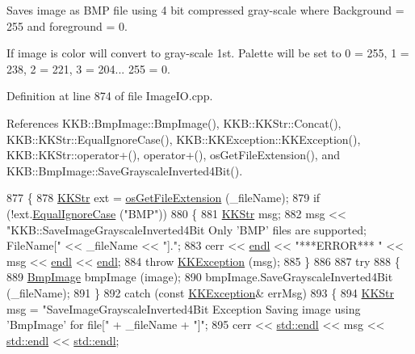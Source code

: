 Saves image as B\+MP file using 4 bit compressed gray-\/scale where Background = 255 and foreground = 0. 

If image is color will convert to gray-\/scale 1st. Palette will be set to 0 = 255, 1 = 238, 2 = 221, 3 = 204... 255 = 0. 

Definition at line 874 of file Image\+I\+O.\+cpp.



References K\+K\+B\+::\+Bmp\+Image\+::\+Bmp\+Image(), K\+K\+B\+::\+K\+K\+Str\+::\+Concat(), K\+K\+B\+::\+K\+K\+Str\+::\+Equal\+Ignore\+Case(), K\+K\+B\+::\+K\+K\+Exception\+::\+K\+K\+Exception(), K\+K\+B\+::\+K\+K\+Str\+::operator+(), operator+(), os\+Get\+File\+Extension(), and K\+K\+B\+::\+Bmp\+Image\+::\+Save\+Grayscale\+Inverted4\+Bit().


\begin{DoxyCode}
877 \{
878   \hyperlink{class_k_k_b_1_1_k_k_str}{KKStr}  ext = \hyperlink{namespace_k_k_b_ac66b0fee156008ea19ba4a0068378743}{osGetFileExtension} (\_fileName);
879   \textcolor{keywordflow}{if}  (!ext.\hyperlink{class_k_k_b_1_1_k_k_str_a562f9696417c53f66bc4088eac072ab5}{EqualIgnoreCase} (\textcolor{stringliteral}{"BMP"}))
880   \{
881     \hyperlink{class_k_k_b_1_1_k_k_str}{KKStr} msg;
882     msg << \textcolor{stringliteral}{"KKB::SaveImageGrayscaleInverted4Bit   Only 'BMP' files are supported;  FileName["} << \_fileName 
      << \textcolor{stringliteral}{"]."};
883     cerr << \hyperlink{namespace_k_k_b_ad1f50f65af6adc8fa9e6f62d007818a8}{endl} << \textcolor{stringliteral}{"***ERROR***    "} << msg << \hyperlink{namespace_k_k_b_ad1f50f65af6adc8fa9e6f62d007818a8}{endl} << \hyperlink{namespace_k_k_b_ad1f50f65af6adc8fa9e6f62d007818a8}{endl};
884     \textcolor{keywordflow}{throw} \hyperlink{class_k_k_b_1_1_k_k_exception}{KKException} (msg);
885   \}
886 
887   \textcolor{keywordflow}{try}
888   \{
889     \hyperlink{class_k_k_b_1_1_bmp_image}{BmpImage}  bmpImage (image);
890     bmpImage.SaveGrayscaleInverted4Bit (\_fileName);
891   \}
892   \textcolor{keywordflow}{catch}  (\textcolor{keyword}{const} \hyperlink{class_k_k_b_1_1_k_k_exception}{KKException}&  errMsg)
893   \{
894     \hyperlink{class_k_k_b_1_1_k_k_str}{KKStr} msg = \textcolor{stringliteral}{"SaveImageGrayscaleInverted4Bit  Exception  Saving image using 'BmpImage'  for file["} 
      + \_fileName + \textcolor{stringliteral}{"]"};
895     cerr << \hyperlink{namespace_k_k_b_ad1f50f65af6adc8fa9e6f62d007818a8}{std::endl} << msg << \hyperlink{namespace_k_k_b_ad1f50f65af6adc8fa9e6f62d007818a8}{std::endl} << \hyperlink{namespace_k_k_b_ad1f50f65af6adc8fa9e6f62d007818a8}{std::endl};

\end{DoxyCode}
